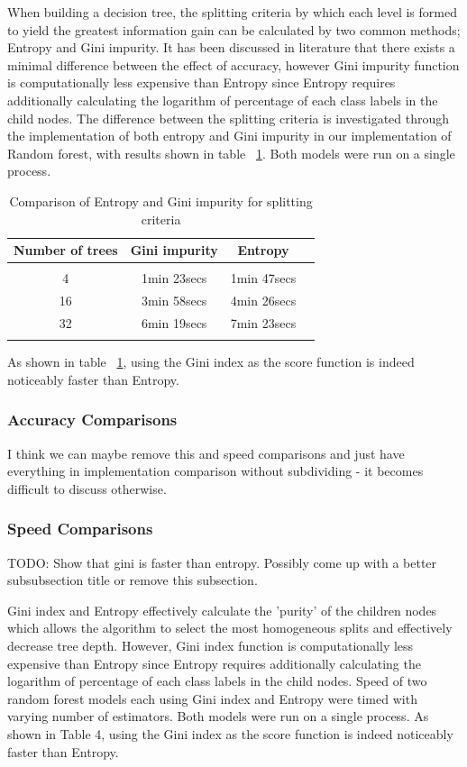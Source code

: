 \documentclass{article} %
\begin{document}
When building a decision tree, the splitting criteria by which each level is formed to yield the greatest information gain can be calculated by two common methods; Entropy and Gini impurity. It has been discussed in literature that there exists a minimal difference between the effect of accuracy, however Gini
impurity function is computationally less expensive than Entropy since Entropy requires additionally calculating the logarithm of percentage of each class labels in the child nodes. The difference between the splitting criteria is investigated through the implementation of both entropy and Gini impurity in our implementation of Random forest, with results shown in table ~\ref{ent-gini}. Both models were run on a single process.

\begin{table}[h]
\caption{Comparison of Entropy and Gini impurity for splitting criteria}
\begin{center}
\begin{tabular}{cccc}
{\bf Number of trees} &{\bf Gini impurity} &{\bf Entropy}
\\ \hline \\
4	&1min 23secs    &1min 47secs\\
16	&3min 58secs    &4min 26secs\\
32	&6min 19secs    &7min 23secs\\
\label{ent-gini}
\end{tabular}
\end{center}
\end{table}

As shown in table ~\ref{ent-gini}, using the Gini index as the score function is indeed noticeably faster than Entropy.


\subsubsection{Accuracy Comparisons}

I think we can maybe remove this and speed comparisons and just have everything in implementation comparison without subdividing - it becomes difficult to discuss otherwise.

\subsubsection{Speed Comparisons}
TODO: Show that gini is faster than entropy.  Possibly come up with a better subsubsection title or remove this subsection.

Gini index and Entropy effectively calculate the ’purity’ of the children nodes which allows the algorithm to select the most homogeneous splits and effectively decrease tree depth. However, Gini index function is computationally less expensive than Entropy since Entropy requires additionally calculating the logarithm of percentage of each class labels in the child nodes. Speed of two random forest models each using Gini index and Entropy were timed with varying number of estimators. Both models were run on a single process. As shown in Table 4, using the Gini index as the score function is indeed noticeably faster than Entropy.
\end{document}
